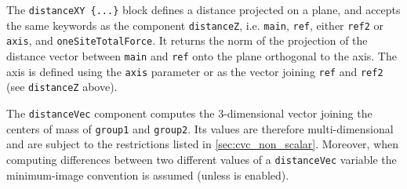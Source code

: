 The \texttt{distanceXY~\{...\}} block defines a distance projected on
a plane, and accepts the same keywords as the component \texttt{distanceZ}, i.e.
\texttt{main}, \texttt{ref}, either \texttt{ref2} or \texttt{axis},
and \texttt{oneSiteTotalForce}.  It returns the norm of the
projection of the distance vector between \texttt{main} and
\texttt{ref} onto the plane orthogonal to the axis.  The axis is
defined using the \texttt{axis} parameter or as the vector joining
\texttt{ref} and \texttt{ref2} (see \texttt{distanceZ} above).

\begin{cvcoptions}
\item %
\item %
\item %
\item %
\item %
\end{cvcoptions}




The \texttt{distanceVec} component computes the 3-dimensional vector joining the centers of mass of
\texttt{group1} and \texttt{group2}.  Its values are therefore multi-dimensional and are subject to
the restrictions listed in \ref{sec:cvc_non_scalar}.  Moreover, when computing differences between
two different values of a \texttt{distanceVec} variable the minimum-image convention is assumed
(unless  is enabled).

\begin{cvcoptions}
\item %
\item %
\item %
\end{cvcoptions}



